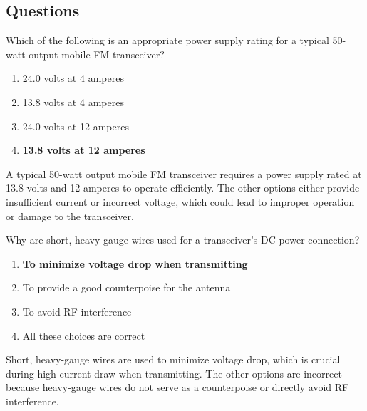 \subsection*{Questions}

\begin{tcolorbox}[colback=gray!10!white,colframe=black!75!black,title={T4A01}]
    Which of the following is an appropriate power supply rating for a typical 50-watt output mobile FM transceiver?
    \begin{enumerate}[label=\Alph*),noitemsep]
        \item 24.0 volts at 4 amperes
        \item 13.8 volts at 4 amperes
        \item 24.0 volts at 12 amperes
        \item \textbf{13.8 volts at 12 amperes}
    \end{enumerate}
\end{tcolorbox}
A typical 50-watt output mobile FM transceiver requires a power supply rated at 13.8 volts and 12 amperes to operate efficiently. The other options either provide insufficient current or incorrect voltage, which could lead to improper operation or damage to the transceiver.


\begin{tcolorbox}[colback=gray!10!white,colframe=black!75!black,title={T4A03}]
    Why are short, heavy-gauge wires used for a transceiver’s DC power connection?
    \begin{enumerate}[label=\Alph*),noitemsep]
        \item \textbf{To minimize voltage drop when transmitting}
        \item To provide a good counterpoise for the antenna
        \item To avoid RF interference
        \item All these choices are correct
    \end{enumerate}
\end{tcolorbox}
Short, heavy-gauge wires are used to minimize voltage drop, which is crucial during high current draw when transmitting. The other options are incorrect because heavy-gauge wires do not serve as a counterpoise or directly avoid RF interference.


